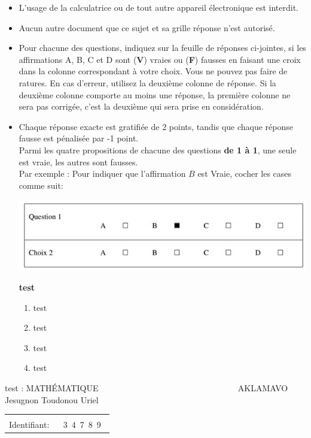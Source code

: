 \documentclass{book}%
\begin{document}
\begin{itemize}%
\item%
L'usage de la calculatrice ou de tout autre appareil électronique est interdit.%
\item%
Aucun autre document que ce sujet et sa grille réponse n'est autorisé.%
\item%
Pour chacune des questions, indiquez sur la feuille de réponses ci-jointes, si les affirmations A, B, C et D sont (\textbf{V}) vraies ou (\textbf{F}) fausses en faisant une croix dans la colonne correspondant à votre choix. Vous ne pouvez pas faire de ratures. En cas d'erreur, utilisez la deuxième colonne de réponse. Si la deuxième colonne comporte au moins une réponse, la première colonne ne sera pas corrigée, c'est la deuxième qui sera prise en considération.%
\item%
Chaque réponse exacte est gratifiée de 2 points, tandis que chaque réponse fausse est pénalisée par -1 point. \\ 	Parmi les quatre propositions de chacune des questions \textbf{de 1 à 1}, une seule est vraie, les autres sont fausses. \\ 	Par exemple : Pour indiquer que l'affirmation $B$ est Vraie, cocher les cases comme suit:  \\ \begin{center}	\includegraphics[scale=0.8]{reponses.png} \end{center}%
\thispagestyle{empty}%
\begin{exercise}%
\textbf{test }%
\begin{enumerate}[label=\textbf{\Alph*. }]%
\item%
test%
\item%
test%
\item%
test%
\item%
test%
\end{enumerate}%
\end{exercise}%
\end{itemize}%
\newpage%
\thispagestyle{empty}%
test : MATHÉMATIQUE $\qquad \qquad \qquad \qquad \qquad \qquad \qquad \qquad$ AKLAMAVO Jesugnon Toudonou Uriel%
\begin{flushright}%
\begin{tabular}{|l|}%
\hline%
 \\%
\thispagestyle{empty}%
Identifiant: $\quad$ {\Large 3~4~7~8~9~}%
 \\%
\hline%
\end{tabular}%
\end{flushright}%
\end{document}
